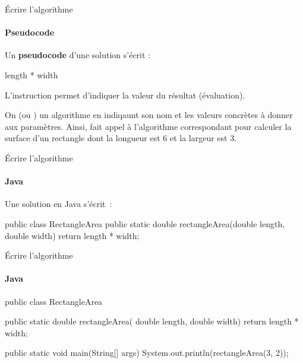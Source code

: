 \begin{frame}{Écrire l'algorithme}
  \framesubtitle{Pseudocode}

  Un \textbf{pseudocode} d'une solution s’écrit :

  \begin{pseudocode}
            \Return length * width
    \EndAlgo
  \end{pseudocode}

  L'instruction  permet d'indiquer la valeur du résultat
  (évaluation).

  On  (ou ) un algorithme en indiqaunt
  son nom et les valeurs concrètes à donner aux paramètres.
  Ainsi,
   fait appel à l’algorithme correspondant
  pour calculer la surface d’un rectangle dont la longueur est $6$ et
  la largeur est $3$.
\end{frame}

\begin{frame}[fragile]{Écrire l'algorithme}
  \framesubtitle{Java}

  Une solution en Java s'écrit~:
\begin{java}
public class RectangleArea {
  public static double rectangleArea(double length, double width) {
    return length * width;
  }
}
\end{java}
\end{frame}

\begin{frame}[fragile]{Écrire l'algorithme}
  \framesubtitle{Java}
\begin{java}
public class RectangleArea {
  public static double rectangleArea(
      double length, double width) {
    return length * width;
  }

  public static void main(String[] args) {
    System.out.println(rectangleArea(3, 2));
  }
}
\end{java}
\end{frame}

